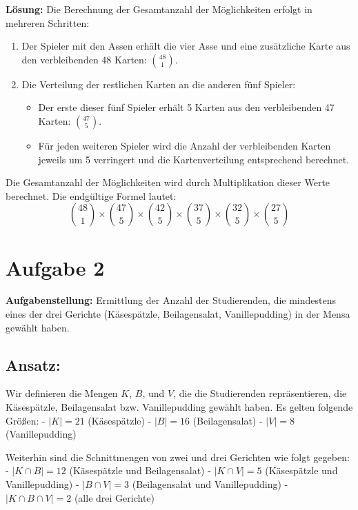 \documentclass{article}
\begin{document}
\begin{enumerate}
		\textbf{Lösung:}
		Die Berechnung der Gesamtanzahl der Möglichkeiten erfolgt in mehreren Schritten:
		\begin{enumerate}
			\item Der Spieler mit den Assen erhält die vier Asse und eine zusätzliche Karte aus den verbleibenden 48 Karten: \( \binom{48}{1} \).
			\item Die Verteilung der restlichen Karten an die anderen fünf Spieler:
			      \begin{itemize}
				      \item Der erste dieser fünf Spieler erhält 5 Karten aus den verbleibenden 47 Karten: \( \binom{47}{5} \).
				      \item Für jeden weiteren Spieler wird die Anzahl der verbleibenden Karten jeweils um 5 verringert und die Kartenverteilung entsprechend berechnet.
			      \end{itemize}
		\end{enumerate}
		Die Gesamtanzahl der Möglichkeiten wird durch Multiplikation dieser Werte berechnet. Die endgültige Formel lautet:
		\[
			\binom{48}{1} \times \binom{47}{5} \times \binom{42}{5} \times \binom{37}{5} \times \binom{32}{5} \times \binom{27}{5}
		\]
\end{enumerate}

\section*{Aufgabe 2}

\textbf{Aufgabenstellung:} Ermittlung der Anzahl der Studierenden, die mindestens eines der drei Gerichte (Käsespätzle, Beilagensalat, Vanillepudding) in der Mensa gewählt haben.

\subsection*{Ansatz:}
Wir definieren die Mengen \( K \), \( B \), und \( V \), die die Studierenden repräsentieren, die Käsespätzle, Beilagensalat bzw. Vanillepudding gewählt haben. Es gelten folgende Größen:
- \( |K| = 21 \) (Käsespätzle)
- \( |B| = 16 \) (Beilagensalat)
- \( |V| = 8 \) (Vanillepudding)

Weiterhin sind die Schnittmengen von zwei und drei Gerichten wie folgt gegeben:
- \( |K \cap B| = 12 \) (Käsespätzle und Beilagensalat)
- \( |K \cap V| = 5 \) (Käsespätzle und Vanillepudding)
- \( |B \cap V| = 3 \) (Beilagensalat und Vanillepudding)
- \( |K \cap B \cap V| = 2 \) (alle drei Gerichte)
\end{document}

